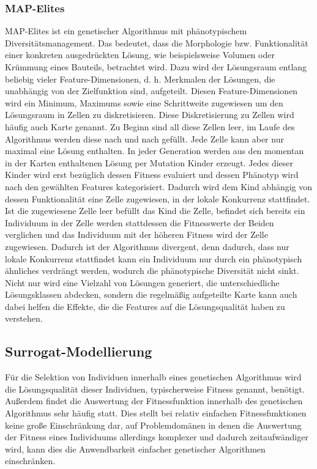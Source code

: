 \subsubsection{MAP-Elites}

\label{sub:mapElites}
MAP-Elites \cite{Mouret.4202015} ist ein genetischer Algorithmus mit phänotypischem Diversitätsmanagement.
Das bedeutet, dass die Morphologie bzw. Funktionalität einer konkreten ausgedrückten Lösung, wie beispielsweise Volumen oder Krümmung eines Bauteils, betrachtet wird.
Dazu wird der Lösungsraum entlang beliebig vieler Feature-Dimensionen, d. h. Merkmalen der Lösungen, die unabhängig von der Zielfunktion sind, aufgeteilt.
Diesen Feature-Dimensionen wird ein Minimum, Maximums sowie eine Schrittweite zugewiesen um den Lösungsraum in Zellen zu diskretisieren.
Diese Diskretisierung zu Zellen wird häufig auch Karte genannt.
Zu Beginn sind all diese Zellen leer, im Laufe des Algorithmus werden diese nach und nach gefüllt.
Jede Zelle kann aber nur maximal eine Lösung enthalten.
In jeder Generation werden aus den momentan in der Karten enthaltenen Lösung per Mutation Kinder erzeugt.
Jedes dieser Kinder wird erst bezüglich dessen Fitness evaluiert und dessen Phänotyp wird nach den gewählten Features kategorisiert.
Dadurch wird dem Kind abhängig von dessen Funktionalität eine Zelle zugewiesen, in der lokale Konkurrenz stattfindet.
Ist die zugewiesene Zelle leer befüllt das Kind die Zelle, befindet sich bereits ein Individuum in der Zelle werden stattdessen die Fitnesswerte der Beiden verglichen und das Individuum mit der höheren Fitness wird der Zelle zugewiesen.
Dadurch ist der Algorithmus divergent, denn dadurch, dass nur lokale Konkurrenz stattfindet kann ein Individuum nur durch ein phänotypisch ähnliches verdrängt werden, wodurch die phänotypische Diversität nicht sinkt.
Nicht nur wird eine Vielzahl von Lösungen generiert, die unterschiedliche Lösungsklassen abdecken, sondern die regelmäßig aufgeteilte Karte kann auch dabei helfen die Effekte, die die Features auf die Lösungsqualität haben zu verstehen.


\subsection{Surrogat-Modellierung}

\label{sub:surrogate}
Für die Selektion von Individuen innerhalb eines genetischen Algorithmus wird die Lösungsqualität dieser Individuen, typischerweise Fitness genannt, benötigt.
Außerdem findet die Auswertung der Fitnessfunktion innerhalb des genetischen Algorithmus sehr häufig statt.
Dies stellt bei relativ einfachen Fitnessfunktionen keine große Einschränkung dar, auf Problemdomänen in denen die Auswertung der Fitness eines Individuums allerdings komplexer und dadurch zeitaufwändiger wird, kann dies die Anwendbarkeit einfacher genetischer Algorithmen einschränken.

